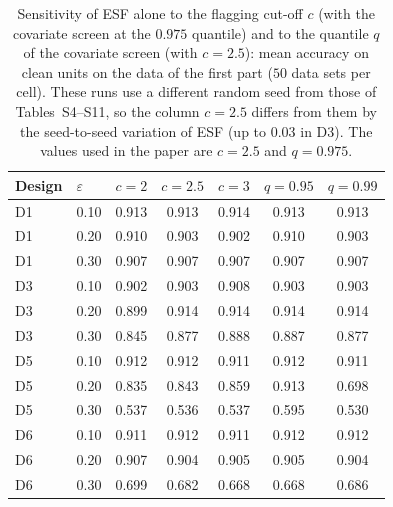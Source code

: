 \begin{table}[htbp]
\centering
\small
\caption{Sensitivity of ESF alone to the flagging cut-off $c$ (with the covariate screen at the $0.975$ quantile) and to the quantile $q$ of the covariate screen (with $c=2.5$): mean accuracy on clean units on the data of the first part ($50$ data sets per cell). These runs use a different random seed from those of Tables~S4--S11, so the column $c=2.5$ differs from them by the seed-to-seed variation of ESF (up to $0.03$ in D3). The values used in the paper are $c=2.5$ and $q=0.975$.}
\label{tab:S3}
\begin{tabular}{llccccc}
\toprule
Design & $\varepsilon$ & $c=2$ & $c=2.5$ & $c=3$ & $q=0.95$ & $q=0.99$ \\
\midrule
D1 & 0.10 & 0.913 & 0.913 & 0.914 & 0.913 & 0.913 \\
D1 & 0.20 & 0.910 & 0.903 & 0.902 & 0.910 & 0.903 \\
D1 & 0.30 & 0.907 & 0.907 & 0.907 & 0.907 & 0.907 \\
D3 & 0.10 & 0.902 & 0.903 & 0.908 & 0.903 & 0.903 \\
D3 & 0.20 & 0.899 & 0.914 & 0.914 & 0.914 & 0.914 \\
D3 & 0.30 & 0.845 & 0.877 & 0.888 & 0.887 & 0.877 \\
D5 & 0.10 & 0.912 & 0.912 & 0.911 & 0.912 & 0.911 \\
D5 & 0.20 & 0.835 & 0.843 & 0.859 & 0.913 & 0.698 \\
D5 & 0.30 & 0.537 & 0.536 & 0.537 & 0.595 & 0.530 \\
D6 & 0.10 & 0.911 & 0.912 & 0.911 & 0.912 & 0.912 \\
D6 & 0.20 & 0.907 & 0.904 & 0.905 & 0.905 & 0.904 \\
D6 & 0.30 & 0.699 & 0.682 & 0.668 & 0.668 & 0.686 \\
\bottomrule
\end{tabular}
\end{table}